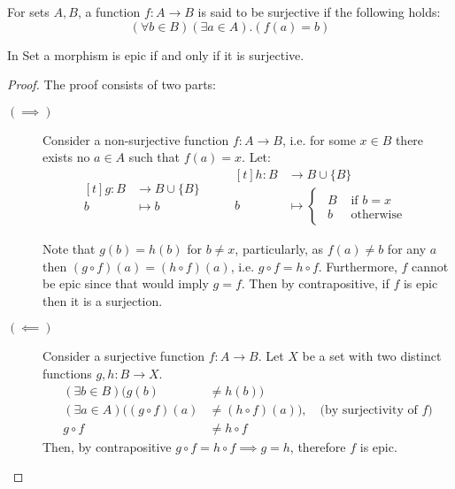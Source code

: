 \begin{definition}

  For sets $A,B$, a function $f:A\to B$ is said to be surjective if the
  following holds:
  \[(\forall b\in B)(\exists a\in A).(f(a)=b)\]
\end{definition}

\begin{theorem}\label{thm:epi_iff_sur}
  In Set a morphism is epic if and only if it is surjective.

  \begin{proof}
    The proof consists of two parts:
    \begin{description}
      \item[$(\implies)$] Consider a non-surjective function $f:A\to B$, i.e.
        for some $x\in B$ there exists no $a\in A$ such that $f(a) = x$. Let:
        \[
          \begin{aligned}[t]
            g:B &\to B \cup \{B\}\\
            b &\mapsto b
          \end{aligned}
          \qquad
          \begin{aligned}[t]
            h:B &\to B \cup \{B\}\\
            b &\mapsto
            \begin{cases}
              \begin{aligned}
                B &\text{ if } b = x\\
                b &\text{ otherwise}
              \end{aligned}
            \end{cases}
          \end{aligned}
        \]

        Note that $g(b) = h(b)$ for $b\neq x$, particularly, as $f(a)\neq b$ for
        any $a$ then $(g\circ f)(a) = (h\circ f)(a)$, i.e. $g\circ f = h\circ
        f$. Furthermore, $f$ cannot be epic since that would imply $g=f$. Then
        by contrapositive, if $f$ is epic then it is a surjection.
      \item[$(\impliedby)$] Consider a surjective function $f:A\to B$. Let $X$
        be a set with two distinct functions $g, h: B \to X$.
        \[
          \begin{aligned}
            (\exists b\in B)(g(b) &\neq h(b))\\
            (\exists a\in A)((g\circ f)(a) &\neq (h\circ f)(a))
            ,\quad\text{(by surjectivity of $f$)}\\
            g\circ f &\neq h\circ f
          \end{aligned}
        \]
        Then, by contrapositive $g\circ f = h\circ f \implies g=h$, therefore
        $f$ is epic.
    \end{description}
  \end{proof}
\end{theorem}

